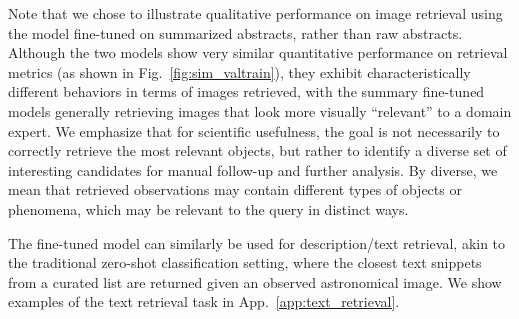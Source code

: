 \documentclass{article} %
\newcommand{\changes}[1]{#1}
\begin{document}
   Note that we chose to illustrate qualitative performance on image retrieval using the model fine-tuned on summarized abstracts, rather than raw abstracts. 
   Although the two models show very similar quantitative performance on retrieval metrics (as shown in Fig.~\ref{fig:sim_valtrain}), they exhibit characteristically different behaviors in terms of images retrieved, with the summary fine-tuned models generally retrieving images that look more visually ``relevant'' to a domain expert. We emphasize that for scientific usefulness, the goal is not necessarily to correctly retrieve the most relevant objects, but rather to identify a diverse set of interesting candidates for manual follow-up and further analysis.  %
   \changes{By diverse, we mean that retrieved observations may contain different types of objects or phenomena, which may be relevant to the query in distinct ways.}

  The fine-tuned model can similarly be used for description/text retrieval, akin to the traditional zero-shot classification setting, where the closest text snippets from a curated list are returned given an observed astronomical image. We show examples of the text retrieval task in App.~\ref{app:text_retrieval}.
\end{document}
